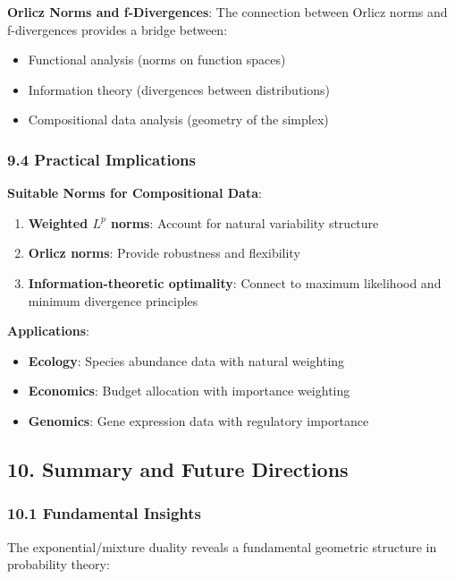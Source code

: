 \documentclass{amsart}
\theoremstyle{plain}
\theoremstyle{definition}
\theoremstyle{remark}
\begin{document}
\textbf{Orlicz Norms and f-Divergences}:
The connection between Orlicz norms and f-divergences provides a bridge between:

\begin{itemize}
	\item Functional analysis (norms on function spaces)
	\item Information theory (divergences between distributions)
	\item Compositional data analysis (geometry of the simplex)
\end{itemize}

\subsubsection{9.4 Practical Implications}

\textbf{Suitable Norms for Compositional Data}:

\begin{enumerate}
	\item \textbf{Weighted $L^p$ norms}: Account for natural variability structure
	\item \textbf{Orlicz norms}: Provide robustness and flexibility
	\item \textbf{Information-theoretic optimality}: Connect to maximum likelihood and minimum divergence principles
\end{enumerate}

\textbf{Applications}:

\begin{itemize}
	\item \textbf{Ecology}: Species abundance data with natural weighting
	\item \textbf{Economics}: Budget allocation with importance weighting
	\item \textbf{Genomics}: Gene expression data with regulatory importance
\end{itemize}

\subsection{10. Summary and Future Directions}

\subsubsection{10.1 Fundamental Insights}

The exponential/mixture duality reveals a fundamental geometric structure in probability theory:
\end{document}
